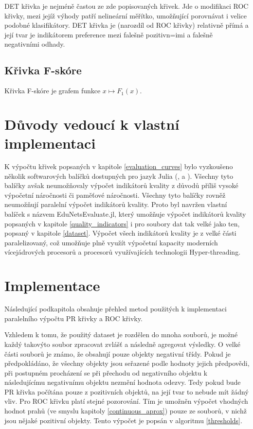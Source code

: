DET křivka je nejméně častou ze zde popisovaných křivek. Jde o modifikaci ROC křivky, mezi jejíž výhody patří nelineární měřítko, umožňující porovnávat i velice podobné klasifikátory. DET křivka je (narozdíl od ROC křivky) relativně přímá a její tvar je indikátorem preference mezi falešně pozitivn=imi a falešně negativními odhady.

\subsection{Křivka F-skóre}
Křivka F-skóre je grafem funkce \( x \mapsto F_1 \left( x \right) \).

\section{Důvody vedoucí k vlastní implementaci}
K výpočtu křivek popsaných v kapitole \ref{evaluation_curves} bylo vyzkoušeno několik softwarových balíčků dostupných pro jazyk Julia (\cite{zea_roc.jl:_2015}, \cite{leeuwen_rocanalysis.jl:_2016} a \cite{lin_mlbase.jl:_2017}). Všechny tyto balíčky avšak neumožňovaly výpočet indikátorů kvality z důvodů příliš vysoké výpočetní náročnosti či paměťové náročnosti. Všechny tyto balíčky rovněž neumožňují paralelní výpočet indikátorů kvality. Proto byl navržen vlastní balíček s názvem EduNetsEvaluate.jl, který umožňuje výpočet indikátorů kvality popsaných v kapitole \ref{quality_indicators} i pro soubory dat tak velké jako ten, popsaný v kapitole \ref{dataset}. Výpočet všech indikátorů kvality je z velké části paralelizovaný, což umožňuje plně využít výpočetní kapacity moderních vícejádrových procesorů a procesorů využívajících technologii Hyper-threading.

\section{Implementace}
Následující podkapitola obsahuje přehled metod použitých k implementaci paralelního výpočtu PR křivky a ROC křivky.

Vzhledem k tomu, že použitý dataset je rozdělen do mnoha souborů, je možné každý takovýto soubor zpracovat zvlášť a následně agregovat výsledky. O velké části souborů je známo, že obsahují pouze objekty negativní třídy. Pokud je předpokládáno, že všechny objekty jsou seřazené podle hodnoty jejich předpovědi, při postupném procházení se při přechodu od negativního objektu k následujícímu negativnímu objektu nezmění hodnota odezvy. Tedy pokud bude PR křivka počítána pouze z pozitivních objektů, na její tvar to nebude mít žádný vliv. Pro ROC křivku platí stejné pozorování. Tím je umožněn výpočet vhodných hodnot prahů (ve smyslu kapitoly \ref{continuous_aprox}) pouze ze souborů, v nichž jsou nějaké pozitivní objekty. Tento výpočet je popsán v algoritmu \ref{thresholds}.

